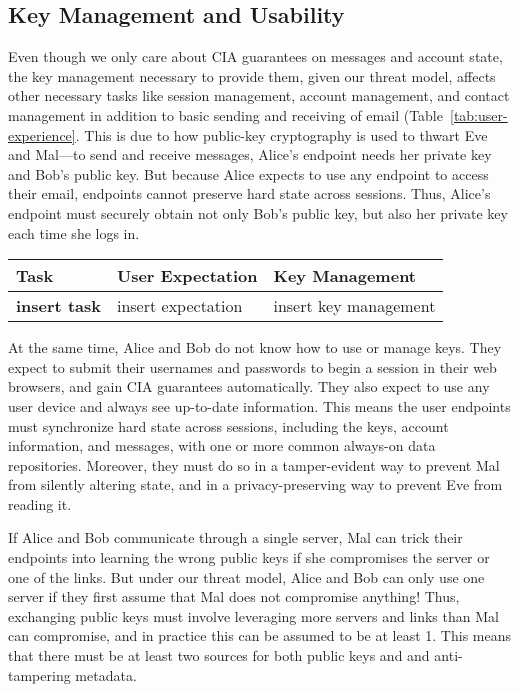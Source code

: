 \subsection{Key Management and Usability}
Even though we only care about CIA guarantees on messages and account 
state, the key management necessary to provide them, given our threat 
model, affects other necessary tasks like session management, account 
management, and contact management in addition to basic sending and 
receiving of email (Table~\ref{tab:user-experience}. This is due to how
public-key cryptography is used to thwart Eve and Mal---to send and
receive messages, Alice’s endpoint needs her private key and Bob’s
public key.  But because Alice expects to use any endpoint to access
their email, endpoints cannot preserve hard state across sessions.  
Thus, Alice’s endpoint must securely obtain not only Bob’s public key, 
but also her private key each time she logs in.

\begin{table*}[ht!]
\begin{tabular}{ | l | l | l |}
\hline
\textbf{Task} & \textbf{User Expectation} & \textbf{Key Management} \\
\hline
\textbf{insert task} & insert expectation & insert key management \\
\hline
\end{tabular}
\caption{Common webmail tasks and expectations, as well as the the 
key management to perform them to gain CIA.}
\label{tab:user-experience}
\end{table*}

At the same time, Alice and Bob do not know how to use or manage keys. 
They expect to submit their usernames and passwords to begin a session 
in their web browsers, and gain CIA guarantees automatically.  They 
also expect to use any user device and always see up-to-date information.  
This means the user endpoints must synchronize hard state across sessions, 
including the keys, account information, and messages, with one or more 
common always-on data repositories.  Moreover, they must do so in a 
tamper-evident way to prevent Mal from silently altering state, and 
in a privacy-preserving way to prevent Eve from reading it.

If Alice and Bob communicate through a single server, Mal can trick 
their endpoints into learning the wrong public keys if she compromises 
the server or one of the links.  But under our threat model, Alice 
and Bob can only use one server if they first assume that Mal does 
not compromise anything!  Thus, exchanging public keys must involve 
leveraging more servers and links than Mal can compromise, and in 
practice this can be assumed to be at least 1.  This means that 
there must be at least two sources for both public keys and and 
anti-tampering metadata.

